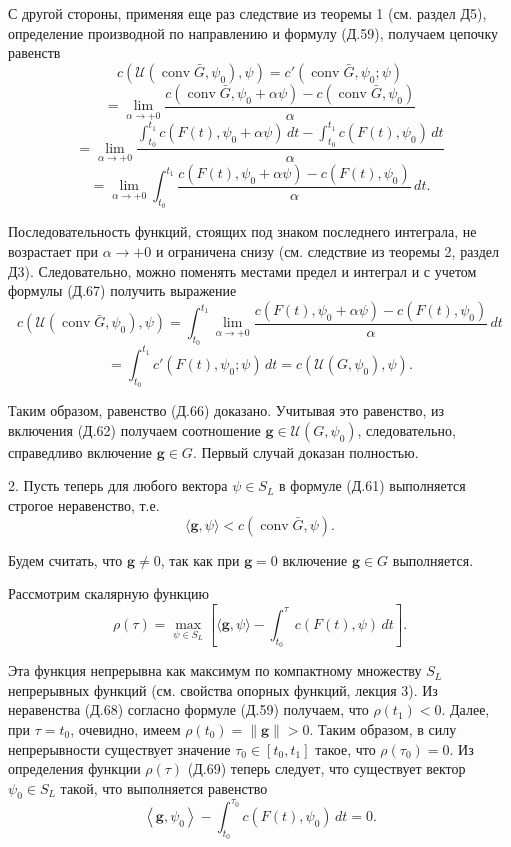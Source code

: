 \documentclass[8pt]{extarticle}
\begin{document}
С другой стороны, применяя еще раз следствие из теоремы 1 (см. раздел Д5), определение производной по направлению и формулу (Д.59), получаем цепочку равенств
\[
c\left( \mathcal{U}\left( \operatorname{conv}\bar{G},\psi_0 \right),\psi \right)
= c'\left( \operatorname{conv}\bar{G},\psi_0;\psi \right)
\]
\[
= \lim_{\alpha \to +0}
\frac{c\left( \operatorname{conv}\bar{G},\psi_0 + \alpha\psi \right) - c\left( \operatorname{conv}\bar{G},\psi_0 \right)}{\alpha}
\]
\[
= \lim_{\alpha \to +0}
\frac{\int_{t_0}^{t_1} c\left( F(t),\psi_0 + \alpha\psi \right)\,dt - \int_{t_0}^{t_1} c\left( F(t),\psi_0 \right)\,dt}{\alpha}
\]
\[
= \lim_{\alpha \to +0}
\int_{t_0}^{t_1}
\frac{c\left( F(t),\psi_0 + \alpha\psi \right) - c\left( F(t),\psi_0 \right)}{\alpha}\,dt.
\]

Последовательность функций, стоящих под знаком последнего интеграла, не возрастает при \(\alpha \to +0\) и ограничена снизу (см. следствие из теоремы 2, раздел Д3). Следовательно, можно поменять местами предел и интеграл и с учетом формулы (Д.67) получить выражение
\[
c\left( \mathcal{U}\left( \operatorname{conv}\bar{G},\psi_0 \right),\psi \right)
= \int_{t_0}^{t_1}
\lim_{\alpha \to +0}
\frac{c\left( F(t),\psi_0 + \alpha\psi \right) - c\left( F(t),\psi_0 \right)}{\alpha}\,dt
\]
\[
= \int_{t_0}^{t_1} c'\left( F(t),\psi_0;\psi \right)\,dt
= c\left( \mathcal{U}\left( G,\psi_0 \right),\psi \right).
\]

Таким образом, равенство (Д.66) доказано. Учитывая это равенство, из включения (Д.62) получаем соотношение \(\mathbf{g} \in \mathcal{U}\left( G,\psi_0 \right)\), следовательно, справедливо включение \(\mathbf{g} \in G\). Первый случай доказан полностью.

2. Пусть теперь для любого вектора \(\psi \in S_L\) в формуле (Д.61) выполняется строгое неравенство, т.е.
\[
\langle \mathbf{g},\psi \rangle < c\left( \operatorname{conv}\bar{G},\psi \right). \tag{Д.68}
\]

Будем считать, что \(\mathbf{g} \neq 0\), так как при \(\mathbf{g} = 0\) включение \(\mathbf{g} \in G\) выполняется.

Рассмотрим скалярную функцию
\[
\rho(\tau) = \max_{\psi \in S_L}
\left[
\langle \mathbf{g},\psi \rangle - \int_{t_0}^{\tau} c\left( F(t),\psi \right)\,dt
\right]. \tag{Д.69}
\]

Эта функция непрерывна как максимум по компактному множеству \(S_L\) непрерывных функций (см. свойства опорных функций, лекция 3). Из неравенства (Д.68) согласно формуле (Д.59) получаем, что \(\rho(t_1) < 0\). Далее, при \(\tau = t_0\), очевидно, имеем \(\rho(t_0) = \|\mathbf{g}\| > 0\). Таким образом, в силу непрерывности существует значение \(\tau_0 \in [t_0,t_1]\) такое, что \(\rho(\tau_0) = 0\). Из определения функции \(\rho(\tau)\) (Д.69) теперь следует, что существует вектор \(\psi_0 \in S_L\) такой, что выполняется равенство
\[
\left\langle \mathbf{g},\psi_0 \right\rangle - \int_{t_0}^{\tau_0} c\left( F(t),\psi_0 \right)\,dt = 0. \tag{Д.70}
\]
\end{document}
